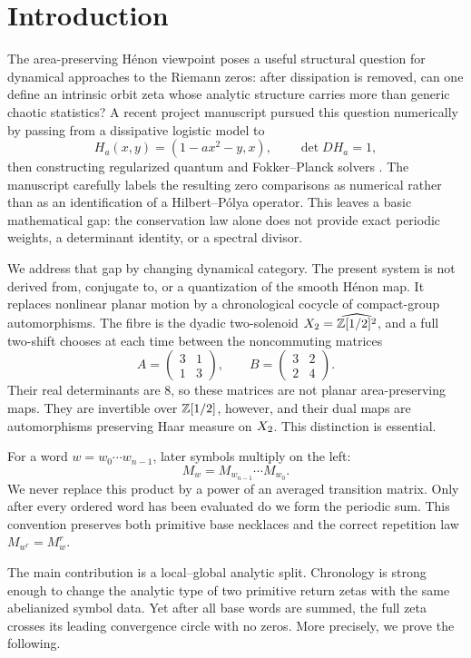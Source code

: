 \section{Introduction}
\label{sec:intro}

The area-preserving H\'enon viewpoint poses a useful structural question for
dynamical approaches to the Riemann zeros: after dissipation is removed, can
one define an intrinsic orbit zeta whose analytic structure carries more than
generic chaotic statistics?  A recent project manuscript pursued this
question numerically by passing from a dissipative logistic model to
\[
 H_a(x,y)=(1-a x^2-y,x),\qquad \det D H_a=1,
\]
then constructing regularized quantum and Fokker--Planck solvers
\citep{Wang2026AreaPreservingHenon}.  The manuscript carefully labels the
resulting zero comparisons as numerical rather than as an identification of a
Hilbert--P\'olya operator.  This leaves a basic mathematical gap: the
conservation law alone does not provide exact periodic weights, a determinant
identity, or a spectral divisor.

We address that gap by changing dynamical category.  The present system is
not derived from, conjugate to, or a quantization of the smooth H\'enon map.
It replaces nonlinear planar motion by a chronological cocycle of
compact-group automorphisms.  The fibre is the dyadic two-solenoid
\(X_2=\widehat{\mathbb{Z}[1/2]^2}\), and a full two-shift chooses at each time
between the noncommuting matrices
\[
 A=\begin{pmatrix}3&1\\1&3\end{pmatrix},\qquad
 B=\begin{pmatrix}3&2\\2&4\end{pmatrix}.
 \tag{1.1}\label{1.1}
\]
Their real determinants are \(8\), so these matrices are not planar
area-preserving maps.  They are invertible over \(\mathbb{Z}[1/2]\), however, and
their dual maps are automorphisms preserving Haar measure on \(X_2\).
This distinction is essential.

For a word \(w=w_0\cdots w_{n-1}\), later symbols multiply on the left:
\[
 M_w=M_{w_{n-1}}\cdots M_{w_0}.
 \tag{1.2}\label{1.2}
\]
We never replace this product by a power of an averaged transition matrix.
Only after every ordered word has been evaluated do we form the periodic
sum.  This convention preserves both primitive base necklaces and the correct
repetition law \(M_{w^r}=M_w^r\).

The main contribution is a local--global analytic split.  Chronology is
strong enough to change the analytic type of two primitive return zetas with
the same abelianized symbol data.  Yet after all base words are summed, the
full zeta crosses its leading convergence circle with no zeros.  More
precisely, we prove the following.

